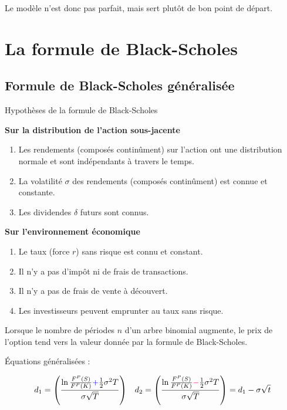 \documentclass[10pt, french]{article}
\begin{document}
\begin{multicols*}{2}
Le modèle n'est donc pas parfait, mais sert plutôt de bon point de départ.

\newpage
\section{La formule de Black-Scholes}

\subsection{Formule de Black-Scholes généralisée}
\begin{conceptgen}{Hypothèses de la formule de Black-Scholes}
\begin{center}
	\textbf{Sur la distribution de l'action sous-jacente}
\end{center}
\begin{enumerate}[leftmargin = *, label = \alph*)]
	\item	Les rendements (composés continûment) sur l'action ont une distribution normale et sont indépendants à travers le temps.
	\item	La volatilité $\sigma$ des rendements (composés continûment) est connue et constante.
	\item	Les dividendes $\delta$ futurs sont connus.
\end{enumerate}
\tcbline
\begin{center}
	\textbf{Sur l'environnement économique}
\end{center}
\begin{enumerate}[leftmargin = *, label = \alph*)]
	\item	Le taux (force $r$) sans risque est connu et constant.
	\item	Il n'y a pas d'impôt	 ni de frais de transactions.
	\item	Il n'y a pas de frais de vente à découvert.
	\item	Les investisseurs peuvent emprunter au taux sans risque.
\end{enumerate}
\end{conceptgen}

Lorsque le nombre de périodes $n$ d'un arbre binomial augmente, le prix de l'option tend vers la valeur donnée par la formule de Black-Scholes.

\begin{definitionNOHFILL}
Équations généralisées :

\begin{align*}
	d_{1}
	&=	\left(
			\frac{\ln\frac{F^{P}(S)}{F^{P}(K)} {\color{blue}{+}} \frac{1}{2} \sigma^{2} T}
	 			 {\sigma\sqrt{T}}
		\right)	&
	d_{2}
	&=	\left(
			\frac{\ln\frac{F^{P}(S)}{F^{P}(K)} {\color{red}{-}} \frac{1}{2} \sigma^{2} T}
	 			 {\sigma\sqrt{T}}
		\right)	
	=	d_{1} - \sigma \sqrt{t}	\\
\end{align*}


\end{definitionNOHFILL}
\end{multicols*}
\end{document}
